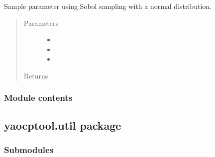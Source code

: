\documentclass[letterpaper,10pt,english]{sphinxmanual}
\begin{document}
\begin{fulllineitems}
\label{\detokenize{yaocptool.stochastic:yaocptool.stochastic.util.sample_parameter_normal_distribution_with_sobol}}
Sample parameter using Sobol sampling with a normal distribution.
\begin{quote}\begin{description}
\item[{Parameters}] \leavevmode\begin{itemize}
\item {} 
 \textendash{} 

\item {} 
 \textendash{} 

\item {} 
 \textendash{} 

\end{itemize}

\item[{Returns}] \leavevmode


\end{description}\end{quote}

\end{fulllineitems}



\subsubsection{Module contents}
\label{\detokenize{yaocptool.stochastic:module-yaocptool.stochastic}}\label{\detokenize{yaocptool.stochastic:module-contents}}

\subsection{yaocptool.util package}
\label{\detokenize{yaocptool.util:yaocptool-util-package}}\label{\detokenize{yaocptool.util::doc}}

\subsubsection{Submodules}
\label{\detokenize{yaocptool.util:submodules}}
\end{document}
